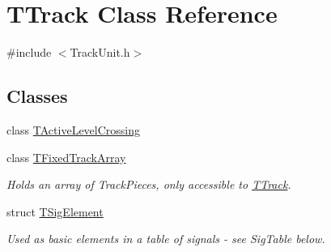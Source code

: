 \hypertarget{class_t_track}{}\section{T\+Track Class Reference}
\label{class_t_track}


{\ttfamily \#include $<$Track\+Unit.\+h$>$}

\subsection*{Classes}
\begin{DoxyCompactItemize}
\item 
class \mbox{\hyperlink{class_t_track_1_1_t_active_level_crossing}{T\+Active\+Level\+Crossing}}
\item 
class \mbox{\hyperlink{class_t_track_1_1_t_fixed_track_array}{T\+Fixed\+Track\+Array}}
\begin{DoxyCompactList}\small\item\em Holds an array of Track\+Pieces, only accessible to \mbox{\hyperlink{class_t_track}{T\+Track}}. \end{DoxyCompactList}\item 
struct \mbox{\hyperlink{struct_t_track_1_1_t_sig_element}{T\+Sig\+Element}}
\begin{DoxyCompactList}\small\item\em Used as basic elements in a table of signals -\/ see Sig\+Table below. \end{DoxyCompactList}\end{DoxyCompactItemize}
